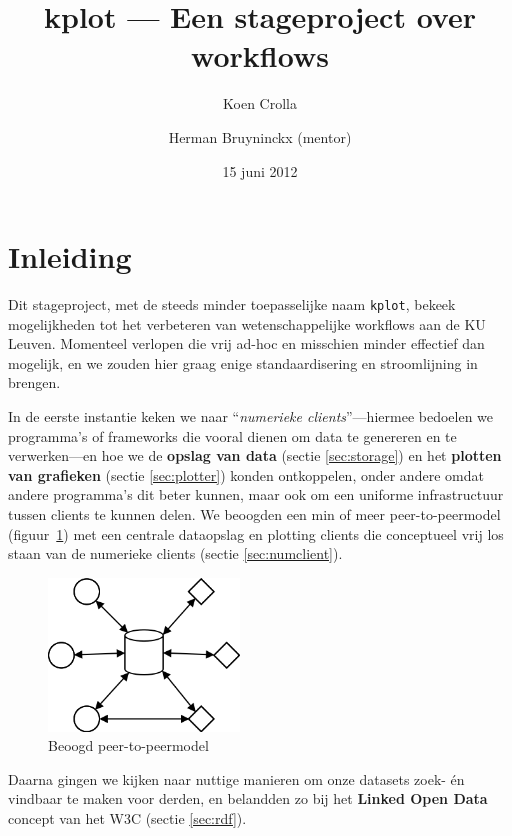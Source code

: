 \documentclass[a4paper]{article}
\title{kplot --- Een stageproject over workflows}
\author{Koen Crolla \and Herman Bruyninckx (mentor)}
\date{15 juni 2012}
\begin{document}
\begin{titlepage}

\maketitle
\thispagestyle{empty}

\setcounter{tocdepth}{2}
\tableofcontents

\end{titlepage}

\section{Inleiding}

Dit stageproject, met de steeds minder toepasselijke naam {\tt kplot}, bekeek
mogelijkheden tot het verbeteren van wetenschappelijke workflows aan de KU
Leuven. Momenteel verlopen die vrij ad-hoc en misschien minder effectief dan
mogelijk, en we zouden hier graag enige standaardisering en stroomlijning in
brengen.

In de eerste instantie keken we naar ``{\it numerieke clients}''---hiermee
bedoelen we programma's of frameworks die vooral dienen om data te genereren
en te verwerken---en hoe we de {\bf opslag van data} (sectie \ref{sec:storage})
en het {\bf plotten van grafieken} (sectie \ref{sec:plotter}) konden
ontkoppelen, onder andere omdat andere programma's dit beter kunnen, maar ook
om een uniforme infrastructuur tussen clients te kunnen delen. We beoogden een
min of meer peer-to-peermodel (figuur~\ref{fig:model}) met een centrale
dataopslag en plotting clients die conceptueel vrij los staan van de numerieke
clients (sectie \ref{sec:numclient}).

\begin{figure}[ht]
  \label{fig:model}
  \centering
  \includegraphics[width=2in]{model.png}
  \caption{Beoogd peer-to-peermodel}
\end{figure}

Daarna gingen we kijken naar nuttige manieren om onze datasets zoek- \'en
vindbaar te maken voor derden, en belandden zo bij het {\bf Linked Open Data}
concept van het \gls{W3C} (sectie \ref{sec:rdf}).
\end{document}

